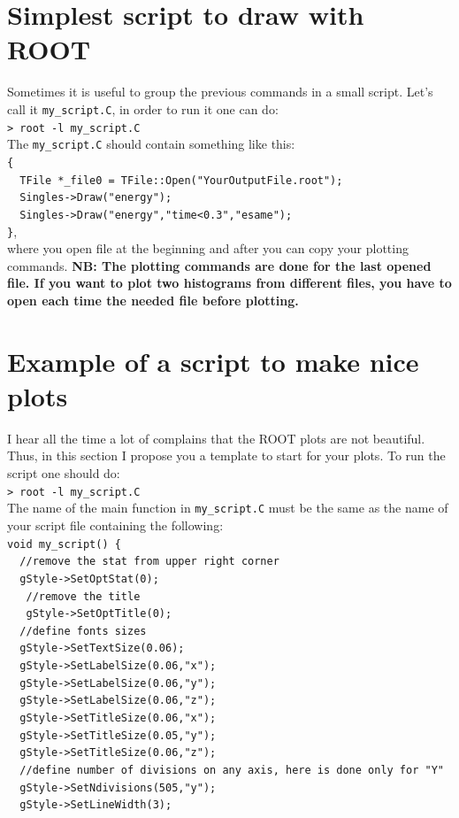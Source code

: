 \documentclass[12pt]{article}
\begin{document}
\clearpage
\section{Simplest script to draw with ROOT}
Sometimes it is useful to group the previous commands in a small script. Let's call it \verb|my_script.C|, in order to run it one can do: \\
 \verb|> root -l my_script.C |\\
 
The \verb|my_script.C| should contain something like this: \\
 \verb|{|\\
 \verb|  TFile *_file0 = TFile::Open("YourOutputFile.root");|\\
 \verb|  Singles->Draw("energy");|\\
 \verb|  Singles->Draw("energy","time<0.3","esame");|\\
 \verb|}|,\\
where you open file at the beginning and after you can copy your plotting commands. 
\textbf{NB: The plotting commands are done for the last opened file. If you want to plot two histograms from different files, you have to open each time the needed file before plotting.}

\section{Example of a script to make nice plots}
I hear all the time a lot of complains that the ROOT plots are not beautiful.  Thus, in this section I propose you a template to start for your plots. To run the script one should do:\\
 \verb|> root -l my_script.C |\\

The name of the main function in \verb|my_script.C| must be the same as the name of your script file containing the following: \\
 \verb|void my_script() {| \\ 
 \verb|  //remove the stat from upper right corner|\\
 \verb|  gStyle->SetOptStat(0);|\\
 \verb|   //remove the title|\\
 \verb|   gStyle->SetOptTitle(0);|\\
 \verb|  //define fonts sizes|\\
 \verb|  gStyle->SetTextSize(0.06);|\\
 \verb|  gStyle->SetLabelSize(0.06,"x");|\\
 \verb|  gStyle->SetLabelSize(0.06,"y");|\\
 \verb|  gStyle->SetLabelSize(0.06,"z");|\\
 \verb|  gStyle->SetTitleSize(0.06,"x");|\\
 \verb|  gStyle->SetTitleSize(0.05,"y");|\\
 \verb|  gStyle->SetTitleSize(0.06,"z");|\\
 \verb|  //define number of divisions on any axis, here is done only for "Y"|\\
\verb|  gStyle->SetNdivisions(505,"y");|\\
\verb|  gStyle->SetLineWidth(3);|\\
\end{document}
